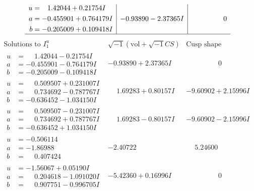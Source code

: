 \documentclass[1p]{elsarticle_modified}
\theoremstyle{definition}
\newcommand{\I}{\sqrt{-1}}
\begin{document}
$$\begin{array}{c|c|c}
\begin{aligned}
u &= \phantom{-}1.42044 + 0.21754 I \\
a &= -0.455901 + 0.764179 I \\
b &= -0.205009 + 0.109418 I\end{aligned}
 & -0.93890 - 2.37365 I & \phantom{-0.000000 } 0\\
 \hline 
 \end{array}$$\newpage$$\begin{array}{c|c|c}  
\text{Solutions to }I^u_{1}& \I (\text{vol} + \sqrt{-1}CS) & \text{Cusp shape}\\
 \hline 
\begin{aligned}
u &= \phantom{-}1.42044 - 0.21754 I \\
a &= -0.455901 - 0.764179 I \\
b &= -0.205009 - 0.109418 I\end{aligned}
 & -0.93890 + 2.37365 I & \phantom{-0.000000 } 0 \\ \hline\begin{aligned}
u &= \phantom{-}0.509507 + 0.231007 I \\
a &= \phantom{-}0.734692 - 0.787767 I \\
b &= -0.636452 - 1.034150 I\end{aligned}
 & \phantom{-}1.69283 + 0.80157 I & -9.60902 + 2.15996 I \\ \hline\begin{aligned}
u &= \phantom{-}0.509507 - 0.231007 I \\
a &= \phantom{-}0.734692 + 0.787767 I \\
b &= -0.636452 + 1.034150 I\end{aligned}
 & \phantom{-}1.69283 - 0.80157 I & -9.60902 - 2.15996 I \\ \hline\begin{aligned}
u &= -0.506114\phantom{ +0.000000I} \\
a &= -1.86988\phantom{ +0.000000I} \\
b &= \phantom{-}0.407424\phantom{ +0.000000I}\end{aligned}
 & -2.40722\phantom{ +0.000000I} & \phantom{-}5.24600\phantom{ +0.000000I} \\ \hline\begin{aligned}
u &= -1.56067 + 0.05190 I \\
a &= \phantom{-}0.204618 - 1.091020 I \\
b &= \phantom{-}0.907751 - 0.996705 I\end{aligned}
 & -5.42360 + 0.16996 I & \phantom{-0.000000 } 0 \\ \hline\begin{aligned}

\end{aligned}
\end{array}$$
\end{document}
